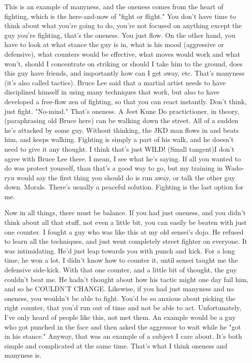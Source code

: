 This is an example of manyness, and the oneness comes from the heart of fighting, which is the here-and-now of "fight or flight." You don't have time to think about what you're going to do, you're not focused on anything except the guy you're fighting, that's the oneness. You just flow.
On the other hand, you have to look at what stance the guy is in, what is his mood (aggressive or defensive), what counters would be effective, what moves would work and what won't, should I concentrate on striking or should I take him to the ground, does this guy have friends, and importantly how can I get away, etc. That's manyness (it's also called tactics).
Bruce Lee said that a martial artist needs to have disciplined himself in using many techniques that work, but also to have developed a free-flow zen of fighting, so that you can react instantly. Don't think, just fight. "No-mind." That's oneness.
A Jeet Kune Do practictioner, in theory, (paraphrasing old Bruce here) can be walking down the street. All of a sudden he's attacked by some guy. Without thinking, the JKD man flows in and beats him, and keeps walking. Fighting is simply a part of his walk, and he doesn't need to give it any thought.
I think that's just WILD! (Small tangent)I don't agree with Bruce Lee there. I mean, I see what he's saying. If all you wanted to do was protect yourself, than that's a good way to go, but my training in Wado-ryu would say the first thing you should do is run away, or talk the other guy down. Morals. There's usually a peaceful solution. Fighting is the last option for me.

Now in all things, there must be balance.
If you had just oneness, and you didn't think about all that stuff, not even a little bit, you can easily be beaten with just one counter. I fought a guy who was like this at my old sensei's dojo. He refused to learn all the techniques, and just went completely street fighter on everyone. It was intimidating. He'd just leap towards you with punch and kick. For a long time, he won a lot. I didn't know how to counter it, until sensei taught me the defensive side-kick. With that one counter, and a little bit of thought, the guy couldn't beat me. He hadn't thought about how his tactic might one day fail him, and so he COULDN'T CHANGE.
Likewise, if you had just manyness and no oneness, you wouldn't be able to fight. You'd be so anxious about picking the right counter, that you'd run out of time and not be able to act. Unfortunately, I've only heard of people like this, not met them. An example would be a guy who got punched in the face and then asked the aggressor to wait while he "got in his stance."
Anyway, that was an example of a subject I care about. It's both simple and complicated at the same time. That's what I think oneness and manyness is.

